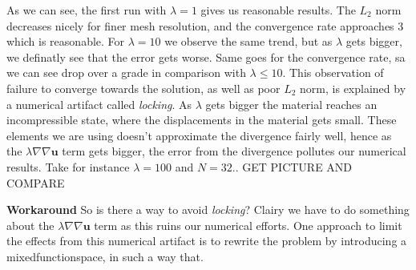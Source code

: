 \documentclass[a4paper,norsk]{article}
\begin{document}
As we can see, the first run with $\lambda = 1$ gives us reasonable results. The $L_2$ norm decreases nicely for finer mesh
resolution, and the convergence rate approaches 3 which is reasonable. For $\lambda = 10$ we observe the same trend, but as $\lambda$ gets bigger, we definatly see that the error gets worse. Same goes for the convergence rate, sa we can see drop over 
a grade in comparison with $\lambda \leq 10$. This observation of failure to converge towards the solution, as well as poor $L_2$ norm, is explained by a numerical artifact called \textit{locking}. As $\lambda$ gets bigger the material reaches an 
incompressible state, where the displacements in the material gets small.
These elements we are using doesn't approximate the divergence fairly well, hence as the 
$\lambda \nabla \nabla \textbf{u}$ term gets bigger, the error from the divergence pollutes our numerical results. Take for 
instance $\lambda = 100$ and $N = 32$.. GET PICTURE AND COMPARE


\textbf{Workaround}
So is there a way to avoid \textit{locking}? Clairy we have to do something about the $\lambda \nabla \nabla \textbf{u}$ term as
this ruins our numerical efforts.
One approach to limit the effects from this numerical artifact is to rewrite
the problem by introducing a mixedfunctionspace, in such a way that.

\begin{align*}

\end{align*}


	
\end{document}
